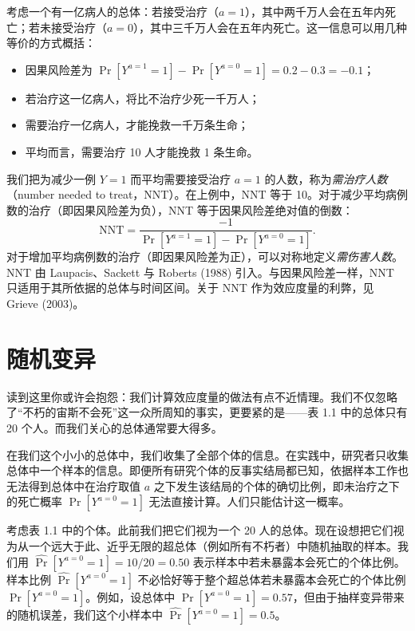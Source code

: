 \begin{finepoint}[需治疗人数]
考虑一个有一亿病人的总体：若接受治疗（$a=1$），其中两千万人会在五年内死亡；若未接受治疗（$a=0$），其中三千万人会在五年内死亡。这一信息可以用几种等价的方式概括：
\begin{itemize}[leftmargin=1.4em,itemsep=0.1em,topsep=0.2em]
\item 因果风险差为 $\Pr[Y^{a=1}=1]-\Pr[Y^{a=0}=1]=0.2-0.3=-0.1$；
\item 若治疗这一亿病人，将比不治疗少死一千万人；
\item 需要治疗一亿病人，才能挽救一千万条生命；
\item 平均而言，需要治疗 10 人才能挽救 1 条生命。
\end{itemize}
我们把为减少一例 $Y=1$ 而平均需要接受治疗 $a=1$ 的人数，称为\emph{需治疗人数}（number needed to treat，NNT）。在上例中，NNT 等于 10。对于减少平均病例数的治疗（即因果风险差为负），NNT 等于因果风险差绝对值的倒数：
\[
\mathrm{NNT}=\frac{-1}{\Pr[Y^{a=1}=1]-\Pr[Y^{a=0}=1]}.
\]
对于增加平均病例数的治疗（即因果风险差为正），可以对称地定义\emph{需伤害人数}。NNT 由 Laupacis、Sackett 与 Roberts (1988) 引入。与因果风险差一样，NNT 只适用于其所依据的总体与时间区间。关于 NNT 作为效应度量的利弊，见 Grieve (2003)。
\end{finepoint}

\section{随机变异}

读到这里你或许会抱怨：我们计算效应度量的做法有点不近情理。我们不仅忽略了“不朽的宙斯不会死”这一众所周知的事实，更要紧的是——表 1.1 中的总体只有 20 个人。而我们关心的总体通常要大得多。

在我们这个小小的总体中，我们收集了全部个体的信息。在实践中，研究者只收集总体中一个样本的信息。即便所有研究个体的反事实结局都已知，依据样本工作也无法得到总体中在治疗取值 $a$ 之下发生该结局的个体的确切比例，即未治疗之下的死亡概率 $\Pr[Y^{a=0}=1]$ 无法直接计算。人们只能估计这一概率。

考虑表 1.1 中的个体。此前我们把它们视为一个 20 人的总体。现在设想把它们视为从一个远大于此、近乎无限的超总体（例如所有不朽者）中随机抽取的样本。我们用 $\widehat{\Pr}[Y^{a=0}=1]=10/20=0.50$ 表示样本中若未暴露本会死亡的个体比例。样本比例 $\widehat{\Pr}[Y^{a=0}=1]$ 不必恰好等于整个超总体若未暴露本会死亡的个体比例 $\Pr[Y^{a=0}=1]$。例如，设总体中 $\Pr[Y^{a=0}=1]=0.57$，但由于抽样变异带来的随机误差，我们这个小样本中 $\widehat{\Pr}[Y^{a=0}=1]=0.5$。

